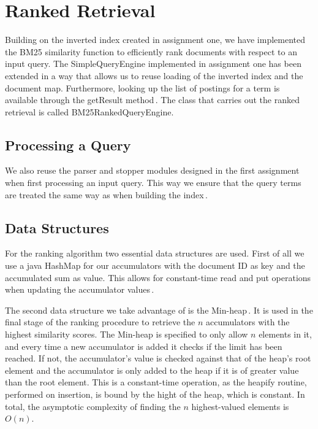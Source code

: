 
\section{Ranked Retrieval}
\label{sec:rankedRetrieval}
Building on the inverted index created in assignment one, we have implemented the BM25 similarity function to efficiently rank documents with respect to an input query. The SimpleQueryEngine implemented in assignment one has been extended in a way that allows us to reuse loading of the inverted index and the document map. Furthermore, looking up the list of postings for a term is available through the getResult method\,\cite{dahlsmith13}. The class that carries out the ranked retrieval is called BM25RankedQueryEngine.

\subsection{Processing a Query}
We also reuse the parser and stopper modules designed in the first assignment when first processing an input query. This way we ensure that the query terms are treated the same way as when building the index\,\cite{dahlsmith13}.


\subsection{Data Structures}
For the ranking algorithm two essential data structures are used. First of all we use a java HashMap for our accumulators with the document ID as key and the accumulated sum as value. This allows for constant-time read and put operations when updating the accumulator values\,\cite{hashmap}.

The second data structure we take advantage of is the Min-heap\,\cite{wolfram13}. It is used in the final stage of the ranking procedure to retrieve the $n$ accumulators with the highest similarity scores. The Min-heap is specified to only allow $n$ elements in it, and every time a new accumulator is added it checks if the limit has been reached. If not, the accumulator's value is checked against that of the heap's root element and the accumulator is only added to the heap if it is of greater value than the root element. This is a constant-time operation, as the heapify routine, performed on insertion, is bound by the hight of the heap, which is constant. In total, the asymptotic complexity of finding the $n$ highest-valued elements is $O(n)$.
